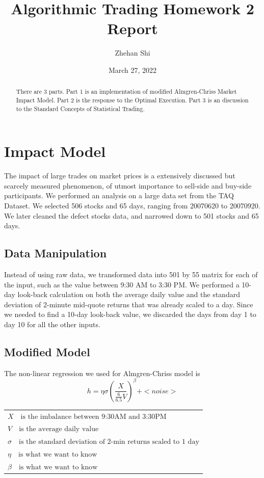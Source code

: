 \documentclass{article}
\title{Algorithmic Trading Homework 2 Report}
\author{Zhehan Shi}
\affil{New York University}
\begin{document}
\date{March 27, 2022}
\maketitle

\begin{abstract}
There are 3 parts. Part 1 is an implementation of modified Almgren-Chriss Market Impact Model. Part 2 is the response to the Optimal Execution. Part 3 is an discussion to the Standard Concepts of Statistical Trading.
\end{abstract}

\section{Impact Model}
The impact of large trades on market prices is a extensively discussed but scarcely measured phenomenon, of utmost importance to sell-side and buy-side participants. We performed an analysis on a large data set from the TAQ Dataset. We selected 506 stocks and 65 days, ranging from 20070620 to 20070920. We later cleaned the defect stocks data, and narrowed down to 501 stocks and 65 days. 
\subsection{Data Manipulation}

Instead of using raw data, we transformed data into 501 by 55 matrix for each of the input, such as the value between 9:30 AM to 3:30 PM. We performed a 10-day look-back calculation on both the average daily value and the standard deviation of 2-minute mid-quote returns that was already scaled to a day. Since we needed to find a 10-day look-back value, we discarded the days from day 1 to day 10 for all the other inputs.

\subsection{Modified Model} 
The non-linear regression we used for Almgren-Chriss model is 
$$h = \eta \sigma (\frac{X}{\frac{6}{6.5}V})^{\beta} + <noise>$$
\begin{table}[ht]
\centering
\begin{tabular}{l}
  $X \quad \text{is the imbalance between 9:30AM and 3:30PM}$\\
  $V \quad \text{is the average daily value}$ \\ 
  $\sigma \quad \text{is the standard deviation of 2-min returns scaled to 1 day}$\\
  $\eta \quad \text{is what we want to know}$\\
  $\beta \quad \text{is what we want to know}$
\end{tabular}
\end{table}
\end{document}
